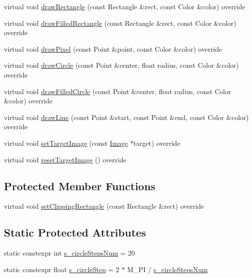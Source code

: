 \begin{DoxyCompactItemize}
\item 
virtual void \mbox{\hyperlink{classagui_1_1_open_g_l_graphics_a88a6af03611b93169c197167c2c014fe}{draw\+Rectangle}} (const Rectangle \&rect, const Color \&color) override
\item 
virtual void \mbox{\hyperlink{classagui_1_1_open_g_l_graphics_a9174e22c26308ae9902f29970a68b687}{draw\+Filled\+Rectangle}} (const Rectangle \&rect, const Color \&color) override
\item 
virtual void \mbox{\hyperlink{classagui_1_1_open_g_l_graphics_a333364e89726e8f7248e050c3bb8ee5a}{draw\+Pixel}} (const Point \&point, const Color \&color) override
\item 
virtual void \mbox{\hyperlink{classagui_1_1_open_g_l_graphics_ade9a5b35baddea11cb56e40676572c45}{draw\+Circle}} (const Point \&center, float radius, const Color \&color) override
\item 
virtual void \mbox{\hyperlink{classagui_1_1_open_g_l_graphics_a7dd166776af1f0e8f85b35ec5e00bd64}{draw\+Filled\+Circle}} (const Point \&center, float radius, const Color \&color) override
\item 
virtual void \mbox{\hyperlink{classagui_1_1_open_g_l_graphics_a4123aa29ef3c9610fc121f3e52cb5e60}{draw\+Line}} (const Point \&start, const Point \&end, const Color \&color) override
\item 
virtual void \mbox{\hyperlink{classagui_1_1_open_g_l_graphics_acb546631e5be32af2c3bac34b4159320}{set\+Target\+Image}} (const \mbox{\hyperlink{class_image}{Image}} $\ast$target) override
\item 
virtual void \mbox{\hyperlink{classagui_1_1_open_g_l_graphics_ab9203c356b807cdff090f23b94cc19fe}{reset\+Target\+Image}} () override
\end{DoxyCompactItemize}
\subsection*{Protected Member Functions}
\begin{DoxyCompactItemize}
\item 
virtual void \mbox{\hyperlink{classagui_1_1_open_g_l_graphics_adcd13d35b9590bfb0019b2a4dd53b692}{set\+Clipping\+Rectangle}} (const Rectangle \&rect) override
\end{DoxyCompactItemize}
\subsection*{Static Protected Attributes}
\begin{DoxyCompactItemize}
\item 
static constexpr int \mbox{\hyperlink{classagui_1_1_open_g_l_graphics_a54efd9b25aaa7c9652c6640d13e1f4dd}{s\+\_\+circle\+Steps\+Num}} = 20
\item 
static constexpr float \mbox{\hyperlink{classagui_1_1_open_g_l_graphics_aaca483f805bee0f62f04c6ffa0bf8c2b}{s\+\_\+circle\+Step}} = 2 $\ast$ M\+\_\+\+PI / \mbox{\hyperlink{classagui_1_1_open_g_l_graphics_a54efd9b25aaa7c9652c6640d13e1f4dd}{s\+\_\+circle\+Steps\+Num}}
\end{DoxyCompactItemize}



